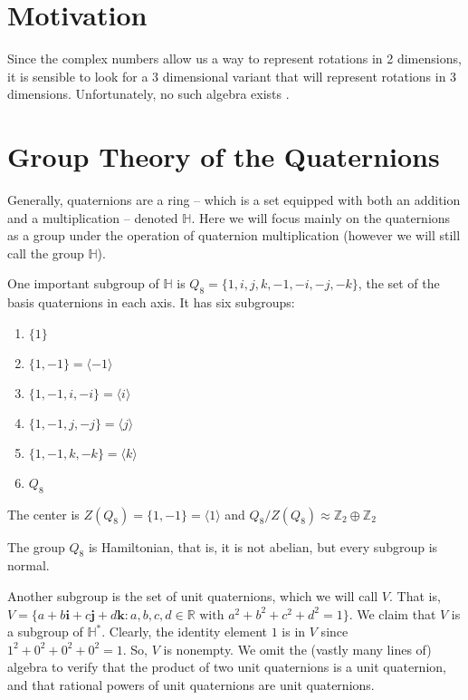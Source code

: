 \documentclass[12pt, letterpaper]{article}
\renewcommand{\i}{\mathbf{i}}
\renewcommand{\j}{\mathbf{j}}
\renewcommand{\k}{\mathbf{k}}
\newcommand{\R}{\mathbb{R}}
\renewcommand{\H}{\mathbb{H}}
\begin{document}
\section{Motivation}
Since the complex numbers allow us a way to represent rotations in 2 dimensions, it is sensible to look for a 3 dimensional variant that will represent rotations in 3 dimensions. Unfortunately, no such algebra exists \cite{frobenius1877}.

\section{Group Theory of the Quaternions}
Generally, quaternions are a ring -- which is a set equipped with both an addition and a multiplication -- denoted $\H$. Here we will focus mainly on the  quaternions as a group under the operation of quaternion multiplication (however we will still call the group $\H$).

One important subgroup of $\H$ is $Q_8 = \{1, i, j, k, -1, -i, -j, -k\}$, the set of the basis quaternions in each axis. It has six subgroups:
\begin{enumerate}
    \item $\{1\}$
    \item $\{1,-1\} = \langle -1 \rangle$
    \item $\{1, -1, i, -i\} = \langle i \rangle$
    \item $\{1, -1, j, -j\} = \langle j \rangle$
    \item $\{1, -1, k, -k\} = \langle k \rangle$
    \item $Q_8$
\end{enumerate}

The center is $Z(Q_8) = \{1, -1\} = \langle 1 \rangle$ and $Q_8 / Z(Q_8) \approx \mathbb{Z}_2 \oplus \mathbb{Z}_2$

The group $Q_8$ is Hamiltonian, that is, it is not abelian, but every subgroup is normal.

Another subgroup is the set of unit quaternions, which we will call $V$. That is, $V=\{a+b\i+c\j+d\k: a,b,c,d \in \R \text{ with }a^2+b^2+c^2+d^2=1\}$. We claim that $V$ is a subgroup of $\H^*$. Clearly, the identity element $1$ is in $V$ since $1^2+0^2+0^2+0^2=1$. So, $V$ is nonempty. We omit the (vastly many lines of) algebra to verify that the product of two unit quaternions is a unit quaternion, and that rational powers of unit quaternions are unit quaternions.

\end{document}
